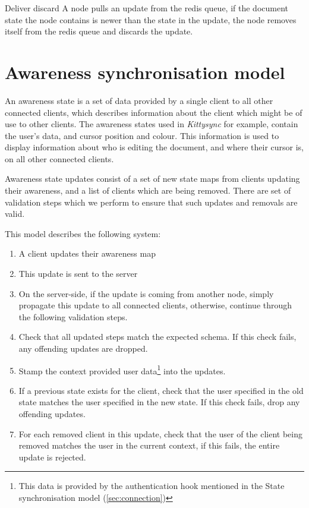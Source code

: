 \documentclass[a4paper, final]{report}
\begin{document}
\begin{definition}{Deliver discard}
	A node pulls an update from the redis queue, if the document state the node contains is newer than
	the state in the update, the node removes itself from the redis queue and discards the update.
\end{definition}

\section{Awareness synchronisation model}
\label{sec:awareness}

An awareness state is a set of data provided by a single client to all other connected clients,
which describes information about the client which might be of use to other clients.
The awareness states used in \textit{Kittysync} for example, contain
the user's data, and cursor position and colour. This information is used to display information
about who is editing the document, and where their cursor is, on all other connected clients.

Awareness state updates consist of a set of new state maps from clients updating their awareness,
and a list of clients which are being removed. There are set of validation steps which we
perform to ensure that such updates and removals are valid.

This model describes the following system:
\begin{enumerate}
	\item A client updates their awareness map
	\item This update is sent to the server
	\item On the server-side, if the update is coming from another node, simply propagate this update
	      to all connected clients, otherwise, continue through the following validation steps.
	\item Check that all updated steps match the expected schema. If this check fails,
	      any offending updates are dropped.
	\item Stamp the context provided user data\footnote{This data is provided by the authentication
		      hook mentioned in the State synchronisation model (\autoref{sec:connection})}
	      into the updates.
	\item If a previous state exists for the client, check that the user specified in the old state matches
	      the user specified in the new state. If this check fails, drop any offending updates.
	\item For each removed client in this update, check that the user of the client being removed matches
	      the user in the current context, if this fails, the entire update is rejected.
\end{enumerate}
\end{document}
